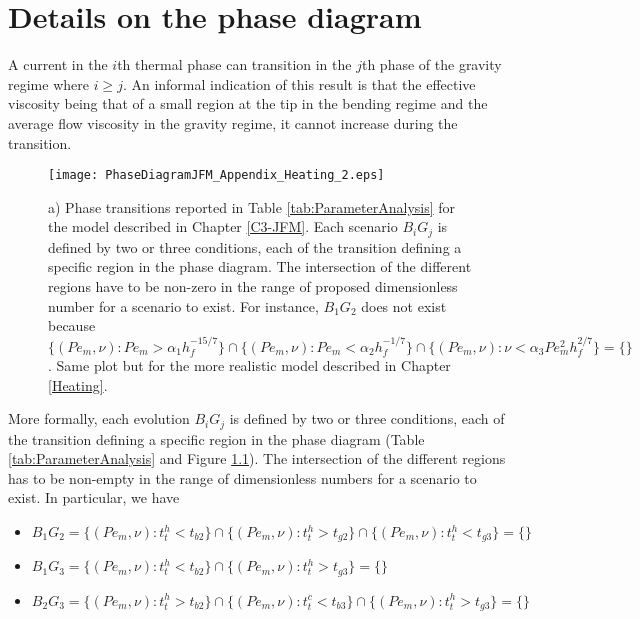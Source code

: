 \chapter{Details on the phase diagram}
\label{chap:A2}

A current in the $i$th thermal phase can transition in the $j$th phase
of the gravity regime where $i  \ge j$. An informal indication of this
result is that the effective viscosity being that of a small region at
the tip  in the bending regime  and the average flow  viscosity in the
gravity regime, it cannot increase during the transition.
\begin{figure}[h!]
  \begin{center}
    \graphicspath{ {/Users/thorey/Documents/These/Projet/Refroidissement/Skin_Model/Figure/Figure_Heating/} }
    \texttt{[image: PhaseDiagramJFM\_Appendix\_Heating\_2.eps]}
    \caption{a)     Phase     transitions    reported     in     Table
      \ref{tab:ParameterAnalysis} for  the model described  in Chapter
      \ref{C3-JFM}. Each scenario $B_iG_j$ is  defined by two or three
      conditions, each of the transition defining a specific region in
      the phase  diagram.  The  intersection of the  different regions
      have  to be  non-zero  in the  range  of proposed  dimensionless
      number for a scenario to exist.  For instance, $B_1G_2$ does not
      exist                                                    because
      $\{(Pe_m,\nu):       Pe_m>\alpha_1      h_f^{-15/7}\}       \cap
      \{(Pe_m,\nu):Pe_m<\alpha_2           h_f^{-1/7}\}           \cap
      \{(Pe_m,\nu):\nu<\alpha_3     Pe_m^2h_f^{2/7}\}     =     \{\}$.
      Same plot but for the  more realistic model described in Chapter
      \ref{Heating}.}
    \label{PD_ALLpossible}
  \end{center}
\end{figure}
More  formally, each  evolution $B_iG_j$  is defined  by two  or three
conditions, each of  the transition defining a specific  region in the
phase   diagram   (Table    \ref{tab:ParameterAnalysis}   and   Figure
\ref{PD_ALLpossible}).  The intersection of  the different regions has
to be non-empty  in the range of dimensionless numbers  for a scenario
to exist. In particular, we have
\begin{itemize}
\item
  $B_1G_2          =         \{(Pe_m,\nu):t_t^h<t_{b2}\}          \cap
  \{(Pe_m,\nu):t_t^h>t_{g2}\} \cap \{(Pe_m,\nu):t_t^h<t_{g3}\}=\{\}$
\item
  $B_1G_3          =         \{(Pe_m,\nu):t_t^h<t_{b2}\}          \cap
  \{(Pe_m,\nu):t_t^h>t_{g3}\} =\{\}$
\item
  $B_2G_3          =         \{(Pe_m,\nu):t_t^h>t_{b2}\}          \cap
  \{(Pe_m,\nu):t_t^c<t_{b3}\} \cap \{(Pe_m,\nu):t_t^h>t_{g3}\}=\{\}$
\end{itemize}
